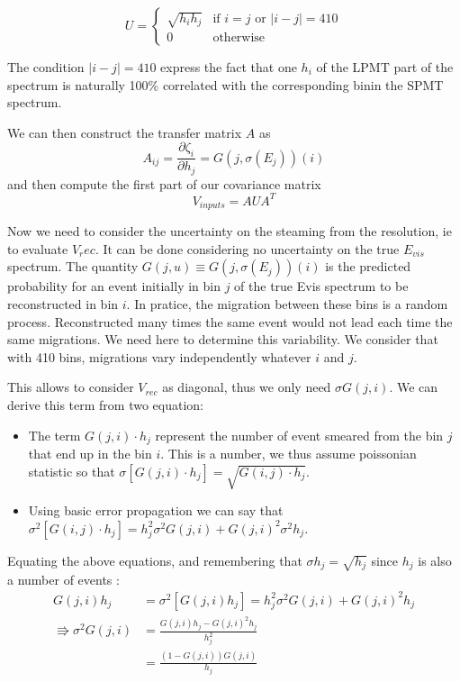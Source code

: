 \documentclass[../main.tex]{subfiles}
\begin{document}
\begin{equation}
  U = \begin{cases}
    \sqrt{h_ih_j}& \text{if } i = j \text { or } |i - j| = 410 \\
    0& \text{otherwise}
  \end{cases}
\end{equation}

The condition $|i - j| = 410$ express the fact that one $h_i$ of the LPMT part of the spectrum is naturally 100\% correlated with the corresponding binin the SPMT spectrum.

We can then construct the transfer matrix $A$ as
\begin{equation}
  A_{ij} = \frac{\partial\zeta_i}{\partial h_j} = G(j, \sigma(E_j))(i)
\end{equation}
and then compute the first part of our covariance matrix
\begin{equation}
  V_{inputs} = A U A^T
\end{equation}

Now we need to consider the uncertainty on the steaming from the resolution, ie to evaluate $V_rec$. It can be done considering no uncertainty on the true $E_{vis}$ spectrum.
The quantity $G(j,u) \equiv G(j,\sigma(E_j))(i)$ is the predicted probability for an event initially in bin $j$ of the true Evis spectrum to be reconstructed in bin $i$. In pratice, the migration between these bins is a random process. Reconstructed many times the same event would not lead each time the same migrations. We need here to determine this variability. We consider that with 410 bins, migrations vary independently whatever $i$ and $j$.

This allows to consider $V_{rec}$ as diagonal, thus we only need $\sigma G(j,i)$.
We can derive this term from two equation:
\begin{itemize}
  \item The term $G(j, i) \cdot h_j$ represent the number of event smeared from the bin $j$ that end up in the bin $i$. This is a number, we thus assume poissonian statistic so that $\sigma[G(j, i) \cdot h_j] = \sqrt{G(i, j) \cdot h_j}$.
  \item Using basic error propagation we can say that $\sigma^2[G(i, j) \cdot h_j] = h_j^2 \sigma^2G(j, i) + G(j, i)^2 \sigma^2 h_j$.
\end{itemize}
Equating the above equations, and remembering that $\sigma h_j=\sqrt{h_j}$ since $h_j$ is also a number of events :
\begin{align}
  G(j, i) h_j &= \sigma^2[G(j, i)h_j] =h_j^2 \sigma^2G(j, i) + G(j, i)^2 h_j \\
  \Rrightarrow \sigma^2 G(j, i) &= \frac{G(j, i) h_j - G(j, i)^2 h_j}{h_j^2} \\
                                &= \frac{(1 - G(j, i))G(j, i)}{h_j}
\end{align}
\end{document}

